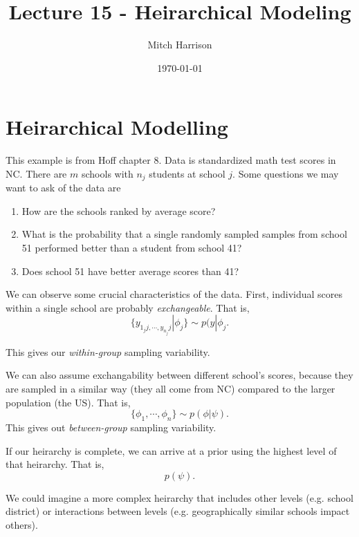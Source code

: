 \documentclass[titlepage, 12pt, leqno]{article}
\title{\Huge{Lecture 15 - Heirarchical Modeling}}
\author{\large{Mitch Harrison}}
\date{\today}
\begin{document}
\setlength{\parskip}{1\baselineskip}
\setlength{\parindent}{15pt}
\maketitle
\tableofcontents
\newpage


\section{Heirarchical Modelling}

This example is from Hoff chapter 8. Data is standardized math test scores in
NC. There are $m$ schools with $n_{j}$ students at school $j$. Some questions
we may want to ask of the data are
\begin{enumerate}
    \item How are the schools ranked by average score?
    \item What is the probability that a single randomly sampled samples from
        school 51 performed better than a student from school 41?
    \item Does school 51 have better average scores than 41?
\end{enumerate}

We can observe some crucial characteristics of the data. First, individual
scores within a single school are probably \textit{exchangeable}. That is,
\[
    \{y_{1_{j}j, \cdots , y_{n_{j}}j} | \phi_{j}\} \sim p(y|\phi_{j}.
\]

This gives our \textit{within-group} sampling variability.

We can also assume exchangability between different school's scores, 
because they are sampled in a similar way (they all come from NC) compared to 
the larger population (the US). That is,
\[
    \{\phi_{1}, \cdots , \phi_{n}\} \sim p(\phi|\psi).
\]
This gives out \textit{between-group} sampling variability.

If our heirarchy is complete, we can arrive at a prior using the highest level 
of that heirarchy. That is,
\[
p(\psi).
\]
\begin{note}
    We could imagine a more complex heirarchy that includes other levels (e.g.
    school district) or interactions between levels (e.g. geographically similar
    schools impact others).
\end{note}
\end{document}
